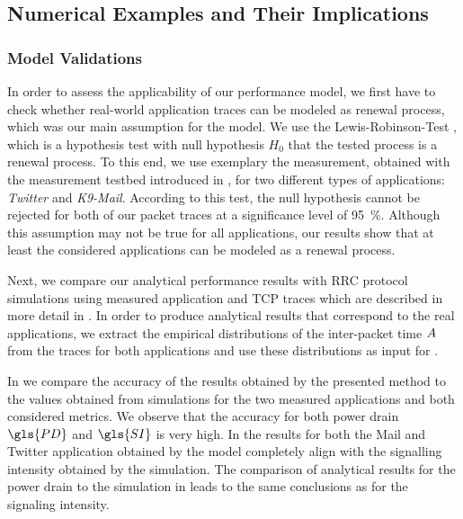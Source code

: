 \subsection{Numerical Examples and Their Implications}\label{sec:network:performance_model:numerical_examples}


\subsubsection*{Model Validations}\label{sec:network:performance_model:validations}

In order to assess the applicability of our performance model, we first have to check whether real-world application traces can be modeled as renewal process, which was our main assumption for the model.
We use the Lewis-Robinson-Test \cite{Ascher1984}, which is a hypothesis test with null hypothesis \(H_0\) that the tested process is a renewal process.
To this end, we use exemplary the measurement, obtained with the measurement testbed introduced in , for two different types of applications: \emph{Twitter} and \emph{K9-Mail}.
According to this test, the null hypothesis cannot be rejected for both of our packet traces at a significance level of \SI{95}{\percent}.
Although this assumption may not be true for all applications, our results show that at least the considered applications can be modeled as a renewal process.

Next, we compare our analytical performance results with \gls{RRC} protocol simulations using measured application and \gls{TCP} traces which are described in more detail in .
In order to produce analytical results that correspond to the real applications, we extract the empirical distributions of the inter-packet time \(A\) from the traces for both applications and use these distributions as input for . 

In  we compare the accuracy of the results  obtained by the presented method to the values obtained from simulations for the two measured applications and both considered metrics.
We observe that the accuracy for both power drain \(\gls{PD}\) and \(\gls{SI}\) is very high.
In  the results for both the Mail and Twitter application obtained by the model completely align with the signalling intensity obtained by the simulation.
The comparison of analytical results for the power drain to the simulation in  leads to the same conclusions as for the signaling intensity.


